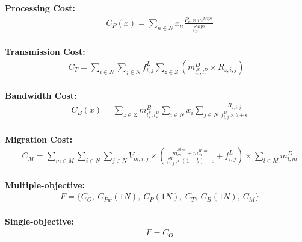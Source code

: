 \documentclass{article}
\begin{document}
\noindent\textbf{Processing Cost:}\\[6pt]
\begin{equation*}
\begin{aligned}
& C_P(x) = \sum_{n\in N} x_n \frac{P_n \times m^{Mips}}{f_n^{Mips}}
\end{aligned}
\end{equation*}\\[6pt]

\noindent\textbf{Transmission Cost:}\\[6pt]
\begin{equation*}
\begin{split}
C_T = \sum_{i\in N}\sum_{j\in N} f^L_{i,j}\sum_{z\in Z}\left( m^D_{l^S_z,l^D_z} \times R_{z, i,j} \right)
\end{split}
\end{equation*}\\[6pt]

\noindent\textbf{Bandwidth Cost:}\\[6pt]
\begin{equation*}
\begin{split}
& C_B(x) = \sum_{z\in Z} m^B_{l^S_z,l^D_z} \sum_{i\in N} x_i \sum_{j\in N} \frac{R_{z, i,j}}{f^B_{i,j} \times b + \epsilon}
\end{split}
\end{equation*}\\[6pt]

\noindent\textbf{Migration Cost:}\\[6pt]
\begin{equation*}
\begin{split}
& C_M = \sum_{m\in M} \sum_{i\in N}\sum_{j\in N}  V_{m, i,j} \times \left(\frac{m^{Strg}_{m} + m^{Ram}_{m}}{f^B_{i,j}\times (1-b) + \epsilon} + f^L_{i,j} \right)\times \sum_{l\in M} m^D_{l, m}
\end{split}
\end{equation*}\\[6pt]

\pagebreak
\noindent\textbf{Multiple-objective:}\\[6pt]
\begin{equation*}
\begin{split}
& F = \{C_O,~ C_{Pw}(1N),~ C_P(1N),~ C_T,~ C_B(1N),~ C_M\}
\end{split}
\end{equation*}\\[6pt]

\noindent\textbf{Single-objective:}\\[6pt]
\begin{equation*}
\begin{split}
& F = C_O
\end{split}
\end{equation*}\\[6pt]
\end{document}
